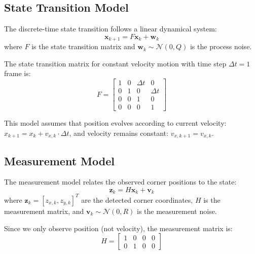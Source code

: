 \documentclass[9pt,a4paper,twocolumn,twoside]{tau-class/tau}
\begin{document}
    \subsection{State Transition Model}

    The discrete-time state transition follows a linear dynamical system:
    \begin{equation}
        \mathbf{x}_{k+1} = F \mathbf{x}_k + \mathbf{w}_k
    \end{equation}
    where $F$ is the state transition matrix and $\mathbf{w}_k \sim \mathcal{N}(0, Q)$ is the process noise.

    The state transition matrix for constant velocity motion with time step $\Delta t = 1$ frame is:
    \begin{equation}
        F = \begin{bmatrix}
            1 & 0 & \Delta t & 0 \\
            0 & 1 & 0 & \Delta t \\
            0 & 0 & 1 & 0 \\
            0 & 0 & 0 & 1
        \end{bmatrix}
    \end{equation}

    This model assumes that position evolves according to current velocity: $x_{k+1} = x_k + v_{x,k} \cdot \Delta t$, and velocity remains constant: $v_{x,k+1} = v_{x,k}$.

    \subsection{Measurement Model}

    The measurement model relates the observed corner positions to the state:
    \begin{equation}
        \mathbf{z}_k = H \mathbf{x}_k + \mathbf{v}_k
    \end{equation}
    where $\mathbf{z}_k = [z_{x,k}, z_{y,k}]^T$ are the detected corner coordinates, $H$ is the measurement matrix, and $\mathbf{v}_k \sim \mathcal{N}(0, R)$ is the measurement noise.

    Since we only observe position (not velocity), the measurement matrix is:
    \begin{equation}
        H = \begin{bmatrix}
            1 & 0 & 0 & 0 \\
            0 & 1 & 0 & 0
        \end{bmatrix}
    \end{equation}
\end{document}
